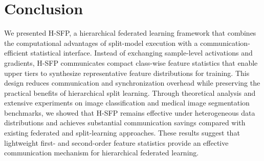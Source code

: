 \section{Conclusion}
We presented H-SFP, a hierarchical federated learning framework that combines the computational advantages of split-model execution with a communication-efficient statistical interface. Instead of exchanging sample-level activations and gradients, H-SFP communicates compact class-wise feature statistics that enable upper tiers to synthesize representative feature distributions for training. This design reduces communication and synchronization overhead while preserving the practical benefits of hierarchical split learning. Through theoretical analysis and extensive experiments on image classification and medical image segmentation benchmarks, we showed that H-SFP remains effective under heterogeneous data distributions and achieves substantial communication savings compared with existing federated and split-learning approaches. These results suggest that lightweight first- and second-order feature statistics provide an effective communication mechanism for hierarchical federated learning.